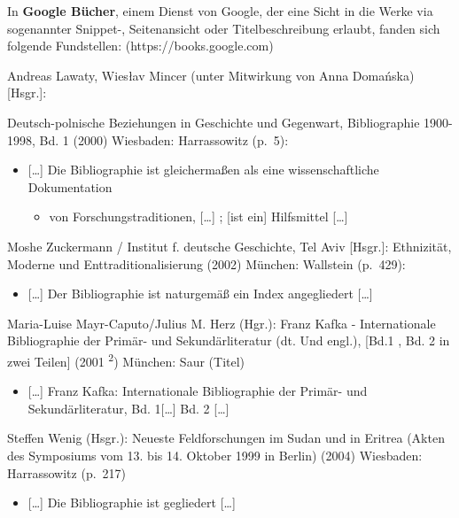 \documentclass[a4paper,
fontsize=11pt,
oneside,
numbers=noperiodatend,
parskip=half-,
bibliography=totoc,
final
]{scrartcl}
\providecommand{\tightlist}{%
  \setlength{\itemsep}{0pt}\setlength{\parskip}{0pt}}
\begin{document}
In \textbf{Google Bücher}, einem Dienst von Google, der eine Sicht in
die Werke via sogenannter Snippet-, Seitenansicht oder Titelbeschreibung
erlaubt, fanden sich folgende Fundstellen: (https://books.google.com)

Andreas Lawaty, Wiesłav Mincer (unter Mitwirkung von Anna Domańska)
{[}Hsgr.{]}:

Deutsch-polnische Beziehungen in Geschichte und Gegenwart, Bibliographie
1900-1998, Bd. 1 (2000) Wiesbaden: Harrassowitz (p.~5):

\begin{itemize}
\item
  {[}\ldots{}{]} Die Bibliographie ist gleichermaßen als eine
  wissenschaftliche Dokumentation

  \begin{itemize}
  \tightlist
  \item
    von Forschungstraditionen, {[}\ldots{}{]} ; {[}ist ein{]}
    Hilfsmittel {[}\ldots{}{]}
  \end{itemize}
\end{itemize}

Moshe Zuckermann / Institut f. deutsche Geschichte, Tel Aviv
{[}Hsgr.{]}: Ethnizität, Moderne und Enttraditionalisierung (2002)
München: Wallstein (p.~429):

\begin{itemize}
\tightlist
\item
  {[}\ldots{}{]} Der Bibliographie ist naturgemäß ein Index angegliedert
  {[}\ldots{}{]}
\end{itemize}

Maria-Luise Mayr-Caputo/Julius M. Herz (Hgr.): Franz Kafka -
Internationale Bibliographie der Primär- und Sekundärliteratur (dt. Und
engl.), {[}Bd.1 , Bd. 2 in zwei Teilen{]} (2001 \textsuperscript{2})
München: Saur (Titel)

\begin{itemize}
\tightlist
\item
  {[}\ldots{}{]} Franz Kafka: Internationale Bibliographie der Primär-
  und Sekundärliteratur, Bd. 1{[}\ldots{}{]} Bd. 2 {[}\ldots{}{]}
\end{itemize}

Steffen Wenig (Hsgr.): Neueste Feldforschungen im Sudan und in Eritrea
(Akten des Symposiums vom 13. bis 14. Oktober 1999 in Berlin) (2004)
Wiesbaden: Harrassowitz (p.~217)

\begin{itemize}
\tightlist
\item
  {[}\ldots{}{]} Die Bibliographie ist gegliedert {[}\ldots{}{]}
\end{itemize}
\end{document}
